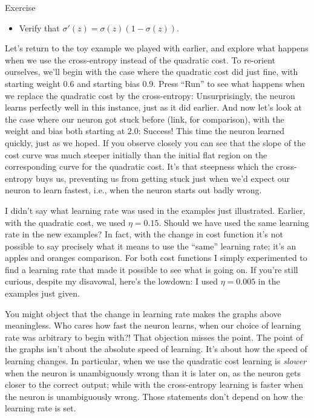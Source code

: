 \begin{exerciseBox}{Exercise}


\begin{itemize}

\item Verify that $\sigma'(z) = \sigma(z)(1-\sigma(z))$.

\end{itemize}


Let's return to the toy example we played with earlier, and explore what happens when we use the cross-entropy instead of the quadratic cost. To re-orient ourselves, we'll begin with the case where the quadratic cost did just fine, with starting weight $0.6$ and starting bias $0.9$. Press ``Run'' to see what happens when we replace the quadratic cost by the cross-entropy: Unsurprisingly, the neuron learns perfectly well in this instance, just as it did earlier. And now let's look at the case where our neuron got stuck before (link, for comparison), with the weight and bias both starting at $2.0$: Success! This time the neuron learned quickly, just as we hoped. If you observe closely you can see that the slope of the cost curve was much steeper initially than the initial flat region on the corresponding curve for the quadratic cost. It's that steepness which the cross-entropy buys us, preventing us from getting stuck just when we'd expect our neuron to learn fastest, i.e., when the neuron starts out badly wrong.


I didn't say what learning rate was used in the examples just illustrated. Earlier, with the quadratic cost, we used $\eta = 0.15$. Should we have used the same learning rate in the new examples? In fact, with the change in cost function it's not possible to say precisely what it means to use the ``same'' learning rate; it's an apples and oranges comparison. For both cost functions I simply experimented to find a learning rate that made it possible to see what is going on. If you're still curious, despite my disavowal, here's the lowdown: I used $\eta = 0.005$ in the examples just given.


You might object that the change in learning rate makes the graphs above meaningless. Who cares how fast the neuron learns, when our choice of learning rate was arbitrary to begin with?! That objection misses the point. The point of the graphs isn't about the absolute speed of learning. It's about how the speed of learning changes. In particular, when we use the quadratic cost learning is \emph{slower} when the neuron is unambiguously wrong than it is later on, as the neuron gets closer to the correct output; while with the cross-entropy learning is faster when the neuron is unambiguously wrong. Those statements don't depend on how the learning rate is set.



\end{exerciseBox}
